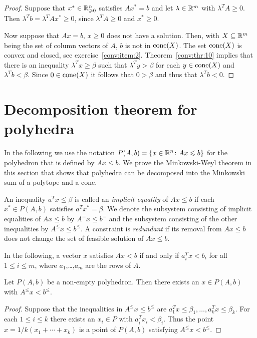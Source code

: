 \begin{proof}
  Suppose that $x^* \in \mathbb{R}^n_{\geqslant0}$ satisfies $Ax^* = b$ and let $\lambda \in
  \mathbb{R}^m$ with $\lambda^T A \geq0$. Then $\lambda^Tb = \lambda^TA x^* \geq0$, since
  $\lambda^TA\geq0$ and $x^*\geq0$. 

  Now suppose that $Ax = b, \,x\geq0$ does not have a solution. Then,
  with   $X\subseteq\mathbb{R}^m$ being  the set of column vectors of $A$, 
  $b$ is not in $\mathrm{cone}(X)$. The set $\mathrm{cone}(X)$ is convex and
  closed, see exercise~\ref{conv:item:2}. Theorem~\ref{conv:thr:10} implies 
  that there is an inequality $\lambda^Tx \geq \beta$ such that $\lambda^Ty > \beta$ for
  each $y \in \mathrm{cone}(X)$ and $\lambda^Tb < \beta$. Since $0 \in \mathrm{cone}(X)$ it follows that $0 > \beta$ and thus that
  $\lambda^Tb<0$. 
  
\end{proof}

\section{Decomposition theorem for polyhedra}
\label{sec:decomp-theor-polyh}

In the following we use the notation $P(A,b) = \{x \in\mathbb{R}^n \colon Ax \leqslant b\}$ for the polyhedron that is defined by $Ax \leq b$. We prove the Minkowski-Weyl theorem in this section that shows that polyhedra can be decomposed into the Minkowski sum of a polytope and a cone. 

\begin{definition}
\label{po:def:5}
An inequality $a^Tx\leq\beta$ is called an \emph{implicit equality} of
$Ax\leq b$ if each $x^* \in P(A,b)$ satisfies $a^Tx^* = \beta$. We denote the
subsystem  consisting of implicit equalities of $Ax\leq b$ by $A^=x\leq b^=$
and the subsystem consisting of the other inequalities by
$A^\leq x\leq b^\leq$. A constraint is \emph{redundant} if its removal from
$Ax\leq b$ does not change the set of feasible solution of $Ax\leq b$.  
\end{definition}

In the following, a vector $x$ satisfies $Ax < b$ if and only if
$a_i^T x < b_i$ for all $1\leq i\leq m$, where $a_1$,\ldots,$a_m$ are the rows of $A$.

\begin{lemma}
  \label{po:lem:3}
  Let $P(A,b)$ be a non-empty polyhedron.
  Then there exists an $x \in P(A,b)$ with $A^\leq x<b^\leq$. 
\end{lemma}
\begin{proof}
  Suppose that the inequalities in  $A^\leq x\leq b^\leq$ are $a_1^Tx\leq\beta_1
  ,\ldots,a_k^Tx\leq\beta_k$. For each $1\leq i\leq k$ there exists an $x_i \in P$ with
  $a_i^Tx_i<\beta_i$. Thus the point $x = 1/k (x_1+\cdots+x_k)$ is a point of
  $P(A,b)$ satisfying  $A^\leq x<b^\leq$. 
\end{proof}


